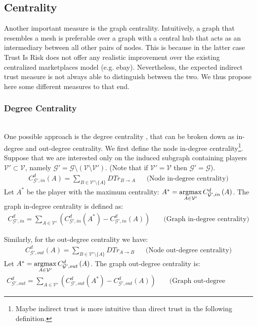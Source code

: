 \subsection{Centrality}
  Another important measure is the graph centrality. Intuitively, a graph that resembles a mesh is preferable over a
  graph with a central hub that acts as an intermediary between all other pairs of nodes. This is because in the latter case
  Trust Is Risk does not offer any realistic improvement over the existing centralized marketplaces model (e.g. ebay).
  Nevertheless, the expected indirect trust measure is not always able to distinguish between the two. We thus propose here
  some different measures to that end.
  
  \subsubsection{Degree Centrality} \ \\

    One possible approach is the degree centrality \cite{freeman}, that can be broken down as in-degree and out-degree
    centrality. We first define the node in-degree centrality\footnote{Maybe indirect trust is more intuitive than direct
    trust in the following definition.}. Suppose that we are interested only on the induced subgraph containing players
    $\mathcal{V}' \subset \mathcal{V}$, namely $\mathcal{G}' = \mathcal{G} \setminus \left(\mathcal{V} \setminus
    \mathcal{V}'\right)$. (Note that if $\mathcal{V}' = \mathcal{V}$ then $\mathcal{G}' = \mathcal{G}$).
    \begin{align*}
      C^d_{\mathcal{G}', in}\left(A\right) = \sum\limits_{B \in \mathcal{V}' \setminus \{A\}}DTr_{B \rightarrow A} && \mbox{
      (Node in-degree centrality)}
    \end{align*}
    Let $A^*$ be the player with the maximum centrality: $A^* = \operatorname*{argmax}\limits_{A \in \mathcal{V}'}C^d_{\mathcal{G}',
    in}\left(A\right)$.  The graph in-degree centrality is defined as:
    \begin{align*}
      C^d_{\mathcal{G}', in} = \sum\limits_{A \in \mathcal{V}'}\left(C^d_{\mathcal{G}', in}\left(A^*\right) -
      C^d_{\mathcal{G}', in}\left(A\right)\right) && \mbox{ (Graph in-degree centrality)}
    \end{align*}
    \addtocounter{footnote}{-1}
    Similarly, for the out-degree centrality we have\footnotemark:
    \begin{align*}
      C^d_{\mathcal{G}', out}\left(A\right) = \sum\limits_{B \in \mathcal{V}' \setminus \{A\}}DTr_{A \rightarrow B} && \mbox{
      (Node out-degree centrality)}
    \end{align*}
    Let $A^* = \operatorname*{argmax}\limits_{A \in \mathcal{V}'}C^d_{\mathcal{G}', out}\left(A\right)$. The graph out-degree centrality is:
    \begin{align*}
      C^d_{\mathcal{G}', out} = \sum\limits_{A \in \mathcal{V}'}\left(C^d_{\mathcal{G}', out}\left(A^*\right) -
      C^d_{\mathcal{G}', out}\left(A\right)\right) && \mbox{ (Graph out-degree centrality)}
    \end{align*}

